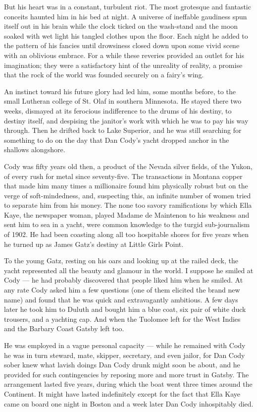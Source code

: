 \documentclass{znotebook}
\begin{document}
But his heart was in a constant, turbulent riot. The most grotesque and fantastic conceits haunted him in his bed at night. A universe of ineffable gaudiness spun itself out in his brain while the clock ticked on the wash-stand and the moon soaked with wet light his tangled clothes upon the floor. Each night he added to the pattern of his fancies until drowsiness closed down upon some vivid scene with an oblivious embrace. For a while these reveries provided an outlet for his imagination; they were a satisfactory hint of the unreality of reality, a promise that the rock of the world was founded securely on a fairy’s wing.

An instinct toward his future glory had led him, some months before, to the small Lutheran college of St. Olaf in southern Minnesota. He stayed there two weeks, dismayed at its ferocious indifference to the drums of his destiny, to destiny itself, and despising the janitor’s work with which he was to pay his way through. Then he drifted back to Lake Superior, and he was still searching for something to do on the day that Dan Cody’s yacht dropped anchor in the shallows alongshore.

Cody was fifty years old then, a product of the Nevada silver fields, of the Yukon, of every rush for metal since seventy-five. The transactions in Montana copper that made him many times a millionaire found him physically robust but on the verge of soft-mindedness, and, suspecting this, an infinite number of women tried to separate him from his money. The none too savory ramifications by which Ella Kaye, the newspaper woman, played Madame de Maintenon to his weakness and sent him to sea in a yacht, were common knowledge to the turgid sub-journalism of 1902. He had been coasting along all too hospitable shores for five years when he turned up as James Gatz’s destiny at Little Girls Point.

To the young Gatz, resting on his oars and looking up at the railed deck, the yacht represented all the beauty and glamour in the world. I suppose he smiled at Cody — he had probably discovered that people liked him when he smiled. At any rate Cody asked him a few questions (one of them elicited the brand new name) and found that he was quick and extravagantly ambitious. A few days later he took him to Duluth and bought him a blue coat, six pair of white duck trousers, and a yachting cap. And when the Tuolomee left for the West Indies and the Barbary Coast Gatsby left too.

He was employed in a vague personal capacity — while he remained with Cody he was in turn steward, mate, skipper, secretary, and even jailor, for Dan Cody sober knew what lavish doings Dan Cody drunk might soon be about, and he provided for such contingencies by reposing more and more trust in Gatsby. The arrangement lasted five years, during which the boat went three times around the Continent. It might have lasted indefinitely except for the fact that Ella Kaye came on board one night in Boston and a week later Dan Cody inhospitably died.
\end{document}
